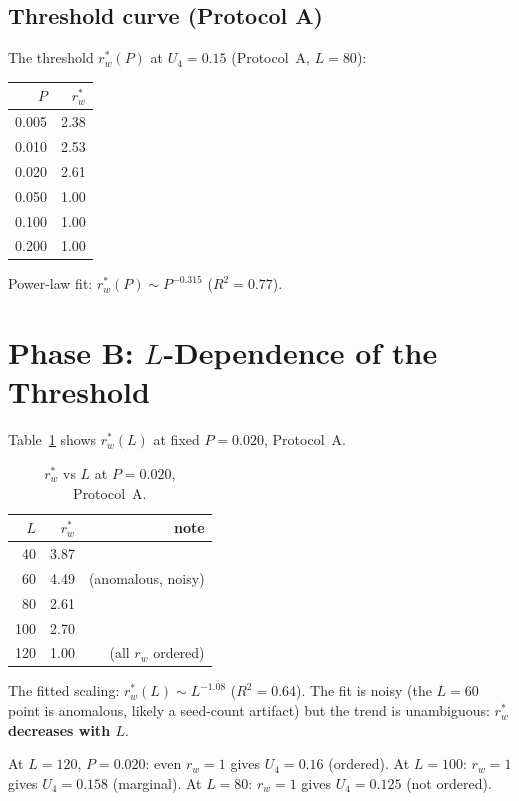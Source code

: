 \documentclass[twocolumn,10pt]{article}
\begin{document}
\subsection{Threshold curve (Protocol A)}

The threshold $r_w^*(P)$ at $U_4=0.15$ (Protocol~A, $L=80$):

\begin{center}
\small
\begin{tabular}{rr}
\toprule
$P$ & $r_w^*$ \\
\midrule
0.005 & 2.38 \\
0.010 & 2.53 \\
0.020 & 2.61 \\
0.050 & 1.00 \\
0.100 & 1.00 \\
0.200 & 1.00 \\
\bottomrule
\end{tabular}
\end{center}

Power-law fit: $r_w^*(P)\sim P^{-0.315}$ ($R^2=0.77$).

\section{Phase B: $L$-Dependence of the Threshold}

Table~\ref{tab:phaseB} shows $r_w^*(L)$ at fixed $P=0.020$, Protocol~A.

\begin{table}[h]
\centering
\caption{$r_w^*$ vs $L$ at $P=0.020$, Protocol~A.}
\label{tab:phaseB}
\begin{tabular}{rrr}
\toprule
$L$ & $r_w^*$ & note \\
\midrule
40  & 3.87 & \\
60  & 4.49 & (anomalous, noisy) \\
80  & 2.61 & \\
100 & 2.70 & \\
120 & 1.00 & (all $r_w$ ordered) \\
\bottomrule
\end{tabular}
\end{table}

The fitted scaling: $r_w^*(L)\sim L^{-1.08}$ ($R^2=0.64$).
The fit is noisy (the $L=60$ point is anomalous, likely a seed-count artifact)
but the trend is unambiguous: \textbf{$r_w^*$ decreases with $L$}.

At $L=120$, $P=0.020$: even $r_w=1$ gives $U_4=0.16$ (ordered).
At $L=100$: $r_w=1$ gives $U_4=0.158$ (marginal).
At $L=80$: $r_w=1$ gives $U_4=0.125$ (not ordered).
\end{document}
